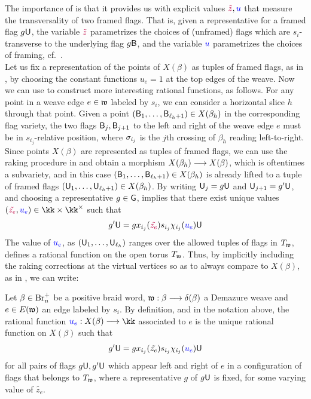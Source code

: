 \noindent The importance of  is that it provides us with explicit values $\textcolor{purple}{\tilde{z}},\textcolor{blue}{u}$ that measure the transversality of two framed flags. That is, given a representative for a framed flag $g\mathsf{U}$, the variable $\textcolor{purple}{\tilde{z}}$ parametrizes the choices of (unframed) flags which are $s_i$-transverse to the underlying flag $g\mathsf{B}$, and the variable $\textcolor{blue}{u}$ parametrizes the choices of framing, cf.~.\\

Let us fix a representation of the points of $X(\beta)$ as tuples of framed flags, as in , by choosing the constant functions $u_e=1$ at the top edges of the weave. Now we can use  to construct more interesting rational functions, as follows. For any point in a weave edge $e\in\mathfrak{w}$ labeled by $s_i$, we can consider a horizontal slice $h$ through that point. Given a point $(\mathsf{B}_1,\ldots,\mathsf{B}_{\ell_h+1})\in X(\beta_h)$ in the corresponding flag variety, the two flags $\mathsf{B}_j,\mathsf{B}_{j+1}$ to the left and right of the weave edge $e$ must be in $s_{i_j}$-relative position, where $\sigma_{i_j}$ is the $j$th crossing of $\beta_h$ reading left-to-right. Since points $X(\beta)$ are represented as tuples of framed flags, we can use the raking procedure in \cite[Section 5]{CGGLSS25} and obtain a morphism $X(\beta_h)\longrightarrow X(\beta)$, which is oftentimes a subvariety, and in this case $(\mathsf{B}_1,\ldots,\mathsf{B}_{\ell_h+1})\in X(\beta_h)$ is already lifted to a tuple of framed flags $(\mathsf{U}_1,\ldots,\mathsf{U}_{\ell_h+1})\in X(\beta_h)$. By writing $\mathsf{U}_j=g\mathsf{U}$ and $\mathsf{U}_{j+1}=g'\mathsf{U}$, and choosing a representative $g\in\mathsf{G}$,  implies that 
there exist unique values $(\textcolor{purple}{\tilde{z_e}},\textcolor{blue}{u_e})\in\kk\times\kk^\times$ such that
$$g'\mathsf{U}=gx_{i_j}(\textcolor{purple}{\tilde{z_e}})s_{i_j}\chi_{i_j}(\textcolor{blue}{u_e})\mathsf{U}$$
The value of $\textcolor{blue}{u_e}$, as $(\mathsf{U}_1,\ldots,\mathsf{U}_{\ell_h})$ ranges over the allowed tuples of flags in $T_{\mathfrak{w}}$, defines a rational function on the open torus $T_{\mathfrak{w}}$. Thus, by implicitly including the raking corrections at the virtual vertices so as to always compare to $X(\beta)$, as in \cite[Section 5]{CGGLSS25}, we can write:

\begin{definition}\label{def:rational_function_weave_edge}
Let $\beta\in\mbox{Br}_n^+$ be a positive braid word, $\mathfrak{w}:\beta\longrightarrow\delta(\beta)$ a Demazure weave and $e\in E(\mathfrak{w})$ an edge labeled by $s_i$. By definition, and in the notation above, the rational function $\textcolor{blue}{u_e}:X(\beta)\lr\kk$ associated to $e$ is the unique rational function on $X(\beta)$ such that
\begin{equation}
g'\mathsf{U}=gx_{i_j}(\tilde{z_e})s_{i_j}\chi_{i_j}(\textcolor{blue}{u_e})\mathsf{U}
\end{equation}
for all pairs of flags $g\mathsf{U},g'\mathsf{U}$ which appear left and right of $e$ in a configuration of flags that belongs to $T_{\mathfrak{w}}$, where a representative $g$ of $g\mathsf{U}$ is fixed, for some varying value of $\tilde{z_e}$.\sbs
\end{definition}

